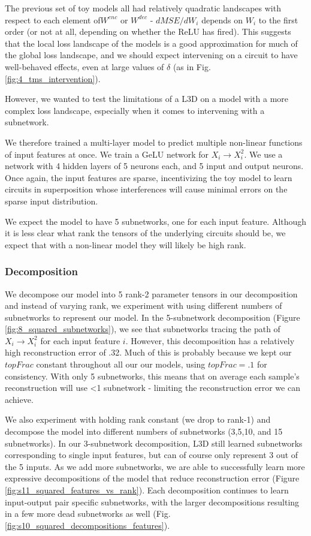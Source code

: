 \documentclass{article}
\theoremstyle{plain}
\theoremstyle{definition}
\theoremstyle{remark}
\begin{document}
The previous set of toy models all had relatively quadratic landscapes with respect to each element of$W^{enc}$ or $W^{dec}$ - $dMSE/dW_i$ depends on $W_i$ to the first order (or not at all, depending on whether the ReLU has fired). This suggests that the local loss landscape of the models is a good approximation for much of the global loss landscape, and we should expect intervening on a circuit to have well-behaved effects, even at large values of $\delta$ (as in Fig. \ref{fig:4_tms_intervention}). 

However, we wanted to test the limitations of a L3D on a model with a more complex loss landscape, especially when it comes to intervening with a subnetwork.

We therefore trained a multi-layer model to predict multiple non-linear functions of input features at once. We train a GeLU network for $X_i \rightarrow X_i^2$. We use a network with 4 hidden layers of 5 neurons each, and 5 input and output neurons. Once again, the input features are sparse, incentivizing the toy model to learn circuits in superposition whose interferences will cause minimal errors on the sparse input distribution. 

We expect the model to have 5 subnetworks, one for each input feature. Although it is less clear what rank the tensors of the underlying circuits should be, we expect that with a non-linear model they will likely be high rank. 

\subsubsection{Decomposition}

We decompose our model into 5 rank-2 parameter tensors in our decomposition and instead of varying rank, we experiment with using different numbers of subnetworks to represent our model. In the 5-subnetwork decomposition (Figure \ref{fig:8_squared_subnetworks}), we see that subnetworks tracing the path of $X_i \rightarrow X_i^2$ for each input feature $i$. However, this decomposition has a relatively high reconstruction error of .32. Much of this is probably because we kept our $topFrac$ constant throughout all our our models, using $topFrac=.1$ for consistency.  With only 5 subnetworks, this means that on average each sample's reconstruction will use <1 subnetwork - limiting the reconstruction error we can achieve. 

We also experiment with holding rank constant (we drop to rank-1) and decompose the model into different numbers of subnetworks (3,5,10, and 15 subnetworks). In our 3-subnetwork decomposition, L3D still learned subnetworks corresponding to single input features, but can of course only represent 3 out of the 5 inputs. As we add more subnetworks, we are able to successfully learn more expressive decompositions of the model that reduce reconstruction error (Figure \ref{fig:s11_squared_features_vs_rank}). Each decomposition continues to learn input-output pair specific subnetworks, with the larger decompositions resulting in a few more dead subnetworks as well (Fig. \ref{fig:s10_squared_decompositions_features}).
\end{document}
